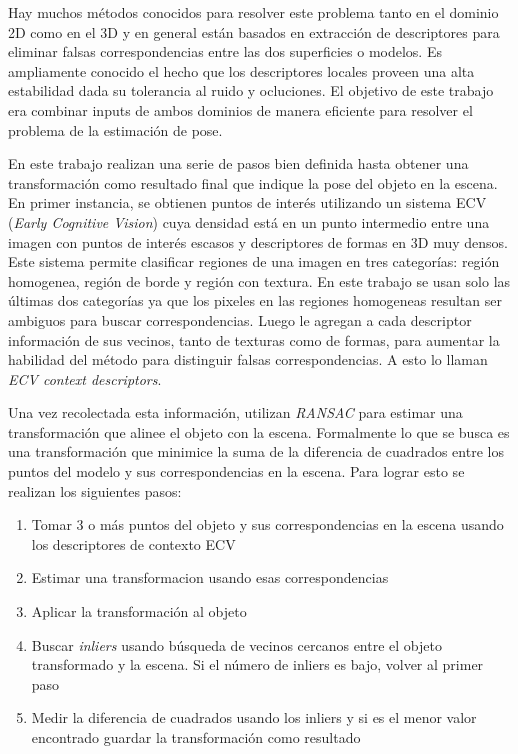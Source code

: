 Hay muchos métodos conocidos para resolver este problema tanto en el dominio 2D como en el 3D y en general están basados en extracción de descriptores para eliminar falsas correspondencias entre las dos superficies o modelos. Es ampliamente conocido el hecho que los descriptores locales proveen una alta estabilidad dada su tolerancia al ruido y ocluciones. El objetivo de este trabajo era combinar inputs de ambos dominios de manera eficiente para resolver el problema de la estimación de pose.

En este trabajo realizan una serie de pasos bien definida hasta obtener una transformación como resultado final que indique la pose del objeto en la escena. En primer instancia, se obtienen puntos de interés utilizando un sistema ECV (\textit{Early Cognitive Vision}) cuya densidad está en un punto intermedio entre una imagen con puntos de interés escasos y descriptores de formas en 3D muy densos. Este sistema permite clasificar regiones de una imagen en tres categorías: región homogenea, región de borde y región con textura. En este trabajo se usan solo las últimas dos categorías ya que los pixeles en las regiones homogeneas resultan ser ambiguos para buscar correspondencias. Luego le agregan a cada descriptor información de sus vecinos, tanto de texturas como de formas, para aumentar la habilidad del método para distinguir falsas correspondencias. A esto lo llaman \textit{ECV context descriptors}.

Una vez recolectada esta información, utilizan \textit{RANSAC} para estimar una transformación que alinee el objeto con la escena. Formalmente lo que se busca es una transformación que minimice la suma de la diferencia de cuadrados entre los puntos del modelo y sus correspondencias en la escena. Para lograr esto se realizan los siguientes pasos:
\begin{enumerate}
	\item Tomar 3 o más puntos del objeto y sus correspondencias en la escena usando los descriptores de contexto ECV
	\item Estimar una transformacion usando esas correspondencias
	\item Aplicar la transformación al objeto
	\item Buscar \textit{inliers} usando búsqueda de vecinos cercanos entre el objeto transformado y la escena. Si el número de inliers es bajo, volver al primer paso
	\item Medir la diferencia de cuadrados usando los inliers y si es el menor valor encontrado guardar la transformación como resultado
\end{enumerate}

